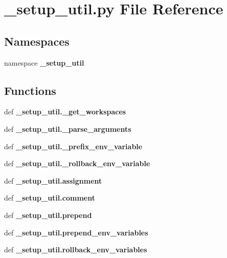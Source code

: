\section{\-\_\-setup\-\_\-util.\-py \-File \-Reference}
\label{devel_2__setup__util_8py}
\subsection*{\-Namespaces}
\begin{DoxyCompactItemize}
\item 
namespace {\bf \-\_\-setup\-\_\-util}
\end{DoxyCompactItemize}
\subsection*{\-Functions}
\begin{DoxyCompactItemize}
\item 
def {\bf \-\_\-setup\-\_\-util.\-\_\-get\-\_\-workspaces}
\item 
def {\bf \-\_\-setup\-\_\-util.\-\_\-parse\-\_\-arguments}
\item 
def {\bf \-\_\-setup\-\_\-util.\-\_\-prefix\-\_\-env\-\_\-variable}
\item 
def {\bf \-\_\-setup\-\_\-util.\-\_\-rollback\-\_\-env\-\_\-variable}
\item 
def {\bf \-\_\-setup\-\_\-util.\-assignment}
\item 
def {\bf \-\_\-setup\-\_\-util.\-comment}
\item 
def {\bf \-\_\-setup\-\_\-util.\-prepend}
\item 
def {\bf \-\_\-setup\-\_\-util.\-prepend\-\_\-env\-\_\-variables}
\item 
def {\bf \-\_\-setup\-\_\-util.\-rollback\-\_\-env\-\_\-variables}
\end{DoxyCompactItemize}
